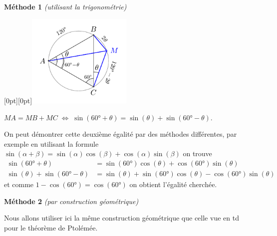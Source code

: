 \documentclass[a4paper,12pt,reqno]{amsart}
\newcommand*{\hldm}[1]{\colorbox{hl}{$\displaystyle #1$}}
\begin{document}
\begin{solution}

  \textbf{Méthode 1} \emph{(utilisant la trigonométrie)}

  {
    \raisebox{-28mm}[0pt][0pt]{\includegraphics[width=5cm]{M67_2017-18_CC_img_trigo}}
  }
  \begin{center}
    \hldm{MA = MB + MC \;\iff\;  \sin(60°+\theta) = \sin(\theta)+\sin(60°-\theta)}.
  \end{center}
  On peut démontrer cette deuxième égalité par des méthodes différentes, par exemple en utilisant la formule $\sin(\alpha+\beta) = \sin(\alpha) \cos(\beta) + \cos(\alpha)\sin(\beta)$ on trouve
  \begin{align*}
    \sin(60°+\theta) &= \sin(60°) \cos(\theta) + \cos(60°)\sin(\theta)  \\
    \sin(\theta)+\sin(60°-\theta) &= \sin(\theta) + \sin(60°) \cos(\theta) - \cos(60°)\sin(\theta)
  \end{align*}
  et comme $1-\cos(60°)=\cos(60°)$ on obtient l'égalité cherchée.

  \textbf{Méthode 2} \emph{(par construction géométrique)}

  Nous allons utiliser ici la même construction géométrique que celle vue en td pour le théorème de Ptolémée.
\end{solution}
\end{document}
